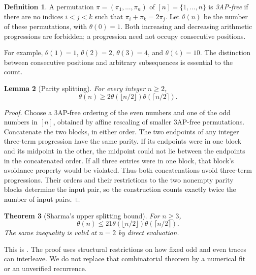 \documentclass[11pt,a4paper]{article}
\numberwithin{equation}{section}
\newtheorem{theorem}{Theorem}[section]
\newtheorem{lemma}[theorem]{Lemma}
\theoremstyle{definition}
\newtheorem{definition}[theorem]{Definition}
\theoremstyle{remark}
\theoremstyle{definition}
\theoremstyle{plain}
\begin{document}
\begin{definition}
A permutation $\pi=(\pi_1,\ldots,\pi_n)$ of $[n]=\{1,\ldots,n\}$ is
\emph{3AP-free} if there are no indices $i<j<k$ such that
$\pi_i+\pi_k=2\pi_j$. Let $\theta(n)$ be the number of these permutations, with
$\theta(0)=1$. Both increasing and decreasing arithmetic progressions are
forbidden; a progression need not occupy consecutive positions.
\end{definition}
For example, $\theta(1)=1$, $\theta(2)=2$, $\theta(3)=4$, and $\theta(4)=10$.
The distinction between consecutive positions and arbitrary subsequences is
essential to the count.

\begin{lemma}[Parity splitting]
For every integer $n\ge2$,
\begin{equation}
 \theta(n)\ge 2\theta(\lfloor n/2\rfloor)
                         \theta(\lceil n/2\rceil).
\label{dsr:eq:lower}
\end{equation}
\end{lemma}
\begin{proof}
Choose a 3AP-free ordering of the even numbers and one of the odd numbers in
$[n]$, obtained by affine rescaling of smaller 3AP-free permutations.
Concatenate the two blocks, in either order. The two endpoints of any
integer three-term progression have the same parity. If its endpoints were
in one block and its midpoint in the other, the midpoint could not lie
between the endpoints in the concatenated order. If all three entries were
in one block, that block's avoidance property would be violated. Thus both
concatenations avoid three-term progressions. Their orders and their
restrictions to the two nonempty parity blocks determine the input pair, so
the construction counts exactly twice the number of input pairs.
\end{proof}

\begin{theorem}[Sharma's upper splitting bound]
For $n\ge3$,
\begin{equation}
 \theta(n)\le 21\theta(\lfloor n/2\rfloor)
                          \theta(\lceil n/2\rceil).
\label{dsr:eq:upper}
\end{equation}
The same inequality is valid at $n=2$ by direct evaluation.
\end{theorem}
This is \cite[Theorem 2.8]{Sharma}. The proof uses structural restrictions on
how fixed odd and even traces can interleave. We do not replace that
combinatorial theorem by a numerical fit or an unverified recurrence.
\end{document}
